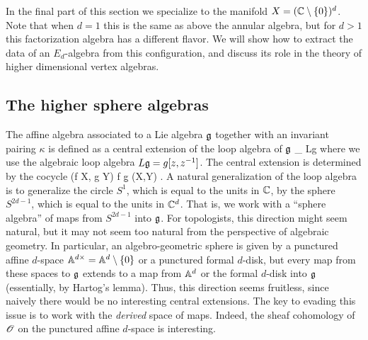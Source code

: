 In the final part of this section we specialize to the manifold $X = (\CC \setminus \{0\})^d$. 
Note that when $d=1$ this is the same as above the annular algebra, but for $d>1$ this factorization algebra has a different flavor. 
We will show how to extract the data of an $E_d$-algebra from this configuration, and discuss its role in the theory of higher dimensional vertex algebras. 



\subsection{The higher sphere algebras}

The affine algebra associated to a Lie algebra $\fg$ together with an invariant pairing $\kappa$ is defined as a central extension of the loop algebra of $\fg$
\ben
\CC \to \Hat{\fg}_{\kappa} \to Lg 
\een
where we use the algebraic loop algebra $L\fg = g [z,z^{-1}]$.
The central extension is determined by the cocycle 
\ben
(f \tensor X, g \tensor Y) \mapsto \oint f \d g \kappa(X,Y) .
\een 
A natural generalization of the loop algebra is to generalize the circle $S^1$, which is equal to the units in $\CC$, by the sphere $S^{2d-1}$, which is equal to the units in $\CC^d$.
That is, we work with a ``sphere algebra'' of maps from $S^{2d-1}$ into $\fg$.
For topologists, this direction might seem natural,
but it may not seem too natural from the perspective of algebraic geometry.
In particular, an algebro-geometric sphere is given by a punctured affine $d$-space $\AA^{d\times} = \AA^d \setminus \{0\}$ or a punctured formal $d$-disk,
but every map from these spaces to $\fg$ extends to a map from $\AA^d$ or the formal $d$-disk into $\fg$ (essentially, by Hartog's lemma).
Thus, this direction seems fruitless, since naively there would be no interesting central extensions.
The key to evading this issue is to work with the {\em derived} space of maps. 
Indeed, the sheaf cohomology of $\sO$ on the punctured affine $d$-space is interesting. 

